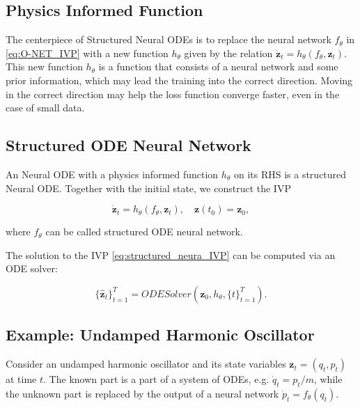 \documentclass[
	parskip, 			   %
	twoside, 			   %
	DIV=14, 			   %
	BCOR=15.0mm, 		   %
	headsepline, 		   %
	open=right, 		   %
	captions=tableheading, %
	bibliography=totoc,    %
	numbers=noenddot       %
]{scrreprt}
\begin{document}
\subsection{Physics Informed Function}

The centerpiece of Structured Neural ODEs is to replace the neural network $f_{\theta}$ in \ref{eq:O-NET_IVP} with a new function $h_{\theta}$ given by the relation $\dot{\mathbf{z}}_t = h_{\theta}(f_{\theta}, \mathbf{z}_t)$. This new function $h_{\theta}$ is a function that consists of a neural network and some prior information, which may lead the training into the correct direction. Moving in the correct direction may help the loss function converge faster, even in the case of small data.

\subsection{Structured ODE Neural Network}

An Neural ODE with a physics informed function $h_{\theta}$ on its RHS is a structured Neural ODE. Together with the initial state, we construct the IVP

\begin{equation}
    \label{eq:structured_neura_IVP}
    \dot{\mathbf{z}}_t = h_{\theta}(f_{\theta}, \mathbf{z}_t), \quad \mathbf{z}(t_{0}) = \mathbf{z}_{0},
\end{equation}

where $f_{\theta}$ can be called structured ODE neural network.

The solution to the IVP \ref{eq:structured_neura_IVP} can be computed via an ODE solver:

\begin{equation}
    \label{eq:structured_O-NET_ODESolver}
        \{ \mathbf{\hat{z}}_{t} \}_{t=1}^{T} = ODESolver(\mathbf{z}_{0}, h_{\theta}, \{ t \}_{t=1}^{T}).
\end{equation}

\subsection{Example: Undamped Harmonic Oscillator}

Consider an undamped harmonic oscillator and its state variables $\mathbf{z}_t=(q_t, p_t)$ at time $t$. The known part is a part of a system of ODEs, e.g. $\dot{q}_t = p_t/m$, while the unknown part is replaced by the output of a neural network $\dot{p}_t = f_{\theta}(q_t)$. 
\end{document}
